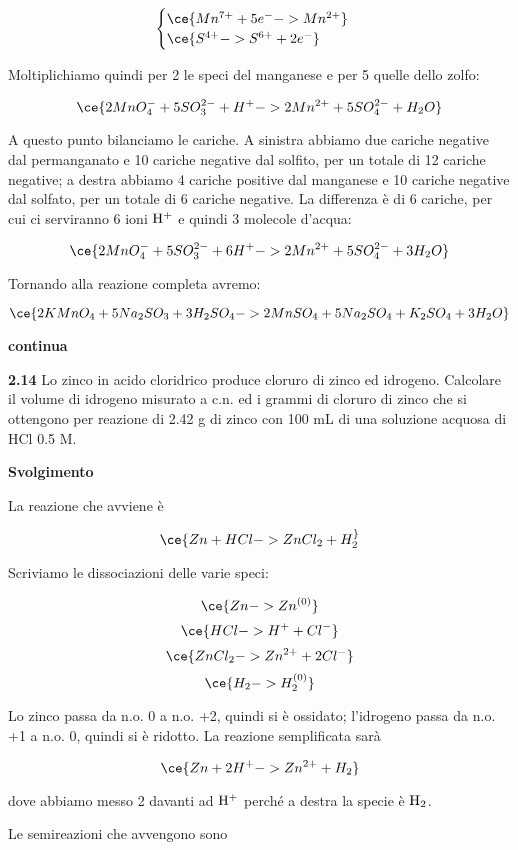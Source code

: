 $$\begin{cases}
\ce{Mn^{7+} + 5e^- -> Mn^{2+}}\\
\ce{S^{4+} -> S^{6+} + 2e^-}
\end{cases}$$

Moltiplichiamo quindi per 2 le speci del manganese e per 5 quelle dello zolfo:

$$\ce{2MnO_4^- + 5SO_3^{2-} + H^+ -> 2Mn^{2+} + 5SO_4^{2-} + H_2O}$$

A questo punto bilanciamo le cariche. A sinistra abbiamo due cariche negative dal permanganato e 10 cariche negative dal solfito, per un totale di 12 cariche negative; a destra abbiamo 4 cariche positive dal manganese e 10 cariche negative dal solfato, per un totale di 6 cariche negative. La differenza è di 6 cariche, per cui ci serviranno 6 ioni $\rm H^+$ e quindi 3 molecole d'acqua:

$$\ce{2MnO_4^- + 5SO_3^{2-} + 6H^+ -> 2Mn^{2+} + 5SO_4^{2-} + 3H_2O}$$

Tornando alla reazione completa avremo:

$$\ce{2KMnO_4 + 5Na_2SO_3 + 3H_2SO_4 -> 2MnSO_4 + 5Na_2SO_4 + K_2SO_4 + 3H_2O}$$

\textbf{continua}

\vspace{0.2cm}\textbf{2.14} Lo zinco in acido cloridrico produce cloruro di zinco ed idrogeno. Calcolare il volume di
idrogeno misurato a c.n. ed i grammi di cloruro di zinco che si ottengono per reazione di 2.42 g di zinco con 100 mL di una soluzione acquosa di HCl 0.5 M.

\vspace{0.2cm}\large\textbf{Svolgimento}\normalsize

\vspace{0.2cm}La reazione che avviene è

$$\ce{Zn + HCl -> ZnCl_2 + H_2 ^}$$

Scriviamo le dissociazioni delle varie speci:

$$\ce{Zn -> Zn^{(0)}}$$
$$\ce{HCl -> H^+ + Cl^-}$$
$$\ce{ZnCl_2 -> Zn^{2+} + 2Cl^-}$$
$$\ce{H_2 -> H_2^{(0)}}$$

Lo zinco passa da n.o. 0 a n.o. +2, quindi si è ossidato; l'idrogeno passa da n.o. +1 a n.o. 0, quindi si è ridotto. La reazione semplificata sarà

$$\ce{Zn + 2H^+ -> Zn^{2+} + H_2}$$

dove abbiamo messo 2 davanti ad $\rm H^+$ perché a destra la specie è $\rm H_2$.

Le semireazioni che avvengono sono

